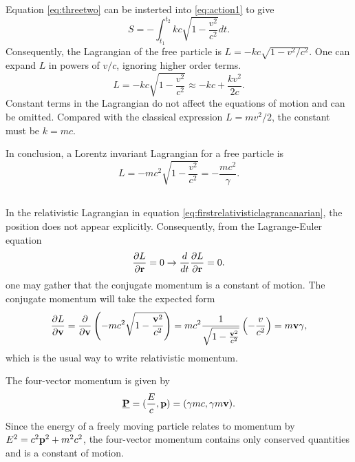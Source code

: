 \documentclass[11pt]{amsart}
\begin{document}
Equation \ref{eq:threetwo} can be insterted into \ref{eq:action1} to give
\begin{equation}
S = - \int_{t_1}^{t_2} k c\sqrt{1-\frac{v^2}{c^2}}dt.
\end{equation}
Consequently, the Lagrangian of the free particle is $L = -kc\sqrt{1-v^2/c^2}$. One can expand $L$ in powers of $v/c$, ignoring higher order terms.
\begin{equation*}
L = -kc\sqrt{1-\frac{v^2}{c^2}} \approx -kc + \frac{kv^2}{2c}.
\end{equation*}
Constant terms in the Lagrangian do not affect the equations of motion and can be omitted. Compared with the classical expression $L = mv^2/2$, the constant must be $k=mc$.

In conclusion, a Lorentz invariant Lagrangian for a free particle is
\begin{equation}
\label{eq:firstrelativisticlagrancanarian}
L = -mc^2\sqrt{1-\frac{v^2}{c^2}} = -\frac{mc^2}{\gamma}.
\end{equation}

\subsection{}
In the relativistic Lagrangian in equation \ref{eq:firstrelativisticlagrancanarian}, the position does not appear explicitly. Consequently, from the Lagrange-Euler equation
\begin{equation*}
\frac{\partial L}{\partial \vb{r}} = 0 \to \frac{d}{dt}\frac{\partial L}{\partial \vb{r}} = 0.
\end{equation*}
one may gather that the conjugate momentum is a constant of motion. The conjugate momentum will take the expected form
\begin{equation}
\frac{\partial L}{\partial \vb{v}} = \frac{\partial}{\partial \vb{v}}\left(-mc^2\sqrt{1-\frac{\vb{v}^2}{c^2}} \right) = mc^2\frac{1}{\sqrt{1-\frac{\vb{v}^2}{c^2}}}\left(-\frac{v}{c^2}\right) = m\vb{v}\gamma,
\end{equation}
which is the usual way to write relativistic momentum.

The four-vector momentum is given by
\begin{equation}
\underline{\vb{P}} = (\frac{E}{c}, \vb{p}) = (\gamma mc, \gamma m\vb{v}).
\end{equation}
Since the energy of a freely moving particle relates to momentum by $E^2 = c^2\vb{p}^2 + m^2c^2$, the four-vector momentum contains only conserved quantities and is a constant of motion.
\end{document}
